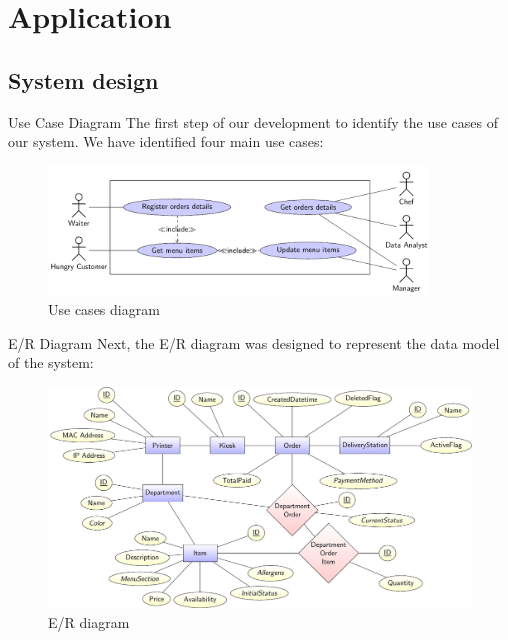

\section{Application}

\subsection{System design}

\begin{frame}{Use Case Diagram}
	The first step of our development to identify the use cases of our system.
	We have identified four main use cases:

	\begin{figure}[h!]
		\centering
		\includegraphics[width=0.9\textwidth,height=0.55\textheight,keepaspectratio]{images/usecases}
		\vspace*{-1\baselineskip}
		\caption{Use cases diagram}
		\label{fig:usecases}
	\end{figure}

\end{frame}

\begin{frame}{E/R Diagram}
	Next, the E/R diagram was designed to represent the data model of the
	system:

	\begin{figure}[h!]
		\centering
		\includegraphics[width=\textwidth,height=0.57\textheight,keepaspectratio]{images/er}
		\caption{E/R diagram}
		\label{fig:er}
	\end{figure}

\end{frame}


